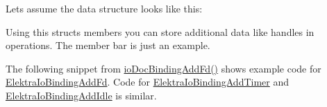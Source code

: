 Let\textquotesingle{}s assume the data structure looks like this\+:


\begin{DoxyCodeInclude}{0}
\DoxyCodeLine{}
\DoxyCodeLine{\{}
\DoxyCodeLine{        \textcolor{comment}{// Add additional members as required}}
\end{DoxyCodeInclude}
 Using this struct\textquotesingle{}s members you can store additional data like handles in operations. The member {\ttfamily bar} is just an example.

The following snippet from \mbox{\hyperlink{io__doc_8c_ae9b5f4e891829f3af8563e8160e1bd02}{io\+Doc\+Binding\+Add\+Fd()}} shows example code for \mbox{\hyperlink{kdbio_8h_addbfc876a15d0b8864196c67ab3e5a26}{Elektra\+Io\+Binding\+Add\+Fd}}. Code for \mbox{\hyperlink{kdbio_8h_a61a8f37e371b8360c92222f58f4691eb}{Elektra\+Io\+Binding\+Add\+Timer}} and \mbox{\hyperlink{kdbio_8h_adcfdf9f514441cabfbfd064fe4021522}{Elektra\+Io\+Binding\+Add\+Idle}} is similar.


